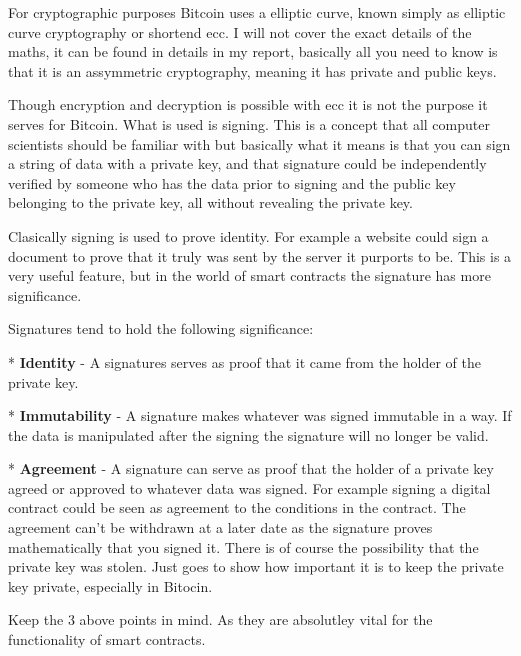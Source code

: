 For cryptographic purposes Bitcoin uses a elliptic curve, known simply as elliptic curve 
cryptography or shortend ecc. I will not cover the exact details of the maths, it can 
be found in details in my report, basically all you need to know is that it is an
assymmetric cryptography, meaning it has private and public keys.
 
Though encryption and decryption is possible with ecc it is not the purpose it serves 
for Bitcoin. What is used is signing. This is a concept that all computer scientists
should be familiar with but basically what it means is that you can sign a string
of data with a private key, and that signature could be independently verified by someone who
has the data prior to signing and the public key belonging to the private key, all
without revealing the private key.

Clasically signing is used to prove identity. For example a website could sign
a document to prove that it truly was sent by the server it purports to be.
This is a very useful feature, but in the world of smart contracts the signature
has more significance.

Signatures tend to hold the following significance:

* \textbf{Identity} - A signatures serves as proof that it came from the holder
of the private key. 

* \textbf{Immutability} - A signature makes whatever was signed immutable in a way.
If the data is manipulated after the signing the signature will no longer be valid.

* \textbf{Agreement} - A signature can serve as proof that the holder of a private 
key agreed or approved to whatever data was signed. For example signing a digital
contract could be seen as agreement to the conditions in the contract. The agreement
can't be withdrawn at a later date as the signature proves mathematically that you 
signed it. There is of course the possibility that the private key was stolen. Just
goes to show how important it is to keep the private key private, especially in
Bitocin.

Keep the 3 above points in mind. As they are absolutley vital for the functionality 
of smart contracts.   

